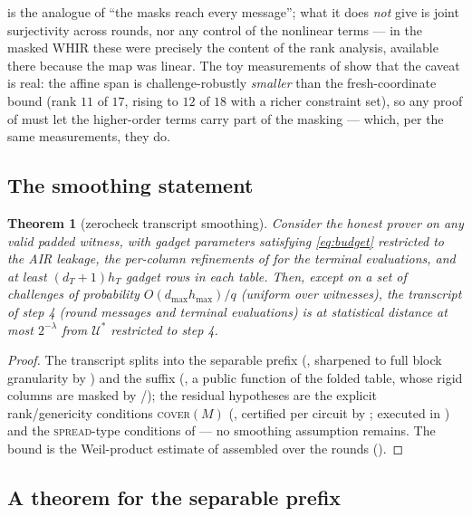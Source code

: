 \documentclass{article}
\newtheorem{theorem}{Theorem}[section]
\theoremstyle{definition}
\begin{document}
 is the analogue of ``the masks reach every message''; what it does \emph{not} give is joint surjectivity across rounds, nor any control of the nonlinear terms --- in the masked WHIR these were precisely the content of the rank analysis, available there because the map was linear. The toy measurements of  show that the caveat is real: the affine span is challenge-robustly \emph{smaller} than the fresh-coordinate bound (rank $11$ of $17$, rising to $12$ of $18$ with a richer constraint set), so any proof of  must let the higher-order terms carry part of the masking --- which, per the same measurements, they do.

\subsection{The smoothing statement}

\begin{theorem}[zerocheck transcript smoothing]\label{conj:air}
Consider the honest prover on any valid padded witness, with gadget parameters satisfying \cref{eq:budget} restricted to the AIR leakage, the per-column refinements of  for the terminal evaluations, and at least $(d_T + 1) h_T$ gadget rows in each table. Then, except on a set of challenges of probability $O(d_{\max} h_{\max})/q$ (uniform over witnesses), the transcript of step 4 (round messages and terminal evaluations) is at statistical distance at most $2^{-\lambda}$ from $\mathcal{U}^*$ restricted to step 4.
\end{theorem}

\begin{proof}
The transcript splits into the separable prefix (, sharpened to full block granularity by ) and the suffix (, a public function of the folded table, whose rigid columns are masked by /); the residual hypotheses are the explicit rank/genericity conditions \textsc{cover}$(M)$ (, certified per circuit by ; executed in ) and the \textsc{spread}-type conditions of  --- no smoothing assumption remains. The bound is the Weil-product estimate of  assembled over the rounds ().
\end{proof}

\subsection{A theorem for the separable prefix}\label{sec:prefix}
\end{document}
